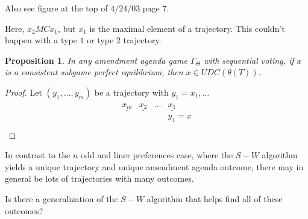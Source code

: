 \documentclass[12pt]{article}
\newtheorem{propo}{Proposition}[section]
\newcommand{\n}{\noindent}
\newcommand{\s}{\vspace{5mm}}
\begin{document}
\begin{center}  Also see figure at the top of $4/24/03$ page $7$.
\end{center}\n Here, $x_2 MC x_1$, but $x_1$ is the maximal element of a trajectory.  This couldn't happen with a type $1$ or type $2$ trajectory.

\s
\n\begin{propo}  In any amendment agenda game $\Gamma_{\Theta}$ with sequential voting, if $x$ is a consistent subgame perfect equilibrium, then $x\in UDC(\theta(T))$.
\end{propo}\begin{proof}  Let $(y_1,\hdots,y_m)$ be a trajectory with $y_1=x_1,\hdots$
\begin{eqnarray*}
\begin{array}{cccc}
\underline{x_m}&\underline{x_2}&\hdots&\underline{x_1}\\
&&&y_1=x\\
\end{array}
\end{eqnarray*}
\end{proof}

\s
\n  In contrast to the $n$ odd and liner preferences case, where the $S-W$ algorithm yields a unique trajectory and unique amendment agenda outcome, there may in general be lots of trajectories with many outcomes.  

\s
\n  Is there a generalization of the $S-W$ algorithm that helps find all of these outcomes?  
\end{document}
